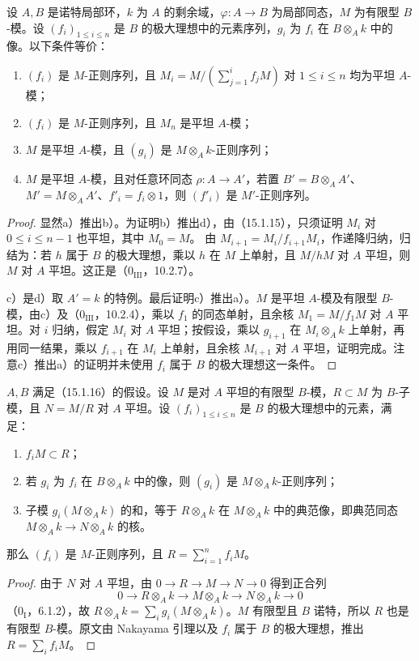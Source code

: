 设 $A,B$ 是诺特局部环，$k$ 为 $A$ 的剩余域，$\varphi:A\to B$ 为局部同态，$M$ 为有限型 $B$-模。设 $(f_i)_{1\leq i\leq n}$ 是 $B$ 的极大理想中的元素序列，$g_i$ 为 $f_i$ 在 $B\otimes_A k$ 中的像。以下条件等价：
\begin{enumerate}[label=\alph*)]
\item $(f_i)$ 是 $M$-正则序列，且 $M_i=M/(\sum_{j=1}^i f_jM)$ 对 $1\leq i\leq n$ 均为平坦 $A$-模；
\item $(f_i)$ 是 $M$-正则序列，且 $M_n$ 是平坦 $A$-模；
\item $M$ 是平坦 $A$-模，且 $(g_i)$ 是 $M\otimes_A k$-正则序列；
\item $M$ 是平坦 $A$-模，且对任意环同态 $\rho:A\to A'$，若置 $B'=B\otimes_A A'$、$M'=M\otimes_A A'$、$f'_i=f_i\otimes1$，则 $(f'_i)$ 是 $M'$-正则序列。
\end{enumerate}
\begin{proof}
显然a）推出b）。为证明b）推出d），由（15.1.15），只须证明 $M_i$ 对 $0\leq i\leq n-1$ 也平坦，其中 $M_0=M$。
由 $M_{i+1}=M_i/f_{i+1}M_i$，作递降归纳，归结为：若 $h$ 属于 $B$ 的极大理想，乘以 $h$ 在 $M$ 上单射，且 $M/hM$ 对 $A$ 平坦，则 $M$ 对 $A$ 平坦。这正是（$0_{\mathrm{III}}$，10.2.7）。

c）是d）取 $A'=k$ 的特例。最后证明c）推出a）。$M$ 是平坦 $A$-模及有限型 $B$-模，由c）及（$0_{\mathrm{III}}$，10.2.4），乘以 $f_1$ 的同态单射，且余核 $M_1=M/f_1M$ 对 $A$ 平坦。对 $i$ 归纳，假定 $M_i$ 对 $A$ 平坦；按假设，乘以 $g_{i+1}$ 在 $M_i\otimes_A k$ 上单射，再用同一结果，乘以 $f_{i+1}$ 在 $M_i$ 上单射，且余核 $M_{i+1}$ 对 $A$ 平坦，证明完成。注意c）推出a）的证明并未使用 $f_i$ 属于 $B$ 的极大理想这一条件。
\end{proof}

$A,B$ 满足（15.1.16）的假设。设 $M$ 是对 $A$ 平坦的有限型 $B$-模，$R\subset M$ 为 $B$-子模，且 $N=M/R$ 对 $A$ 平坦。设 $(f_i)_{1\leq i\leq n}$ 是 $B$ 的极大理想中的元素，满足：
\begin{enumerate}[label=(\roman*)]
\item $f_iM\subset R$；
\item 若 $g_i$ 为 $f_i$ 在 $B\otimes_A k$ 中的像，则 $(g_i)$ 是 $M\otimes_A k$-正则序列；
\item 子模 $g_i(M\otimes_A k)$ 的和，等于 $R\otimes_A k$ 在 $M\otimes_A k$ 中的典范像，即典范同态 $M\otimes_A k\to N\otimes_A k$ 的核。
\end{enumerate}
那么 $(f_i)$ 是 $M$-正则序列，且 $R=\sum_{i=1}^n f_iM$。
\begin{proof}
由于 $N$ 对 $A$ 平坦，由 $0\to R\to M\to N\to0$ 得到正合列
\[
 0\longrightarrow R\otimes_A k\longrightarrow M\otimes_A k
 \longrightarrow N\otimes_A k\longrightarrow0
\]
（$0_{\mathrm I}$，6.1.2），故 $R\otimes_A k=\sum_i g_i(M\otimes_A k)$。$M$ 有限型且 $B$ 诺特，所以 $R$ 也是有限型 $B$-模。原文由 Nakayama 引理以及 $f_i$ 属于 $B$ 的极大理想，推出 $R=\sum_i f_iM$。
\end{proof}

